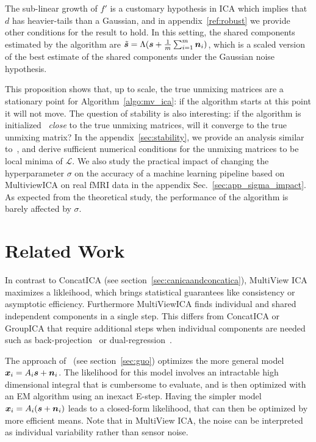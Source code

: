 %
The sub-linear growth of $f'$ is a customary hypothesis in ICA which implies that $d$ has heavier-tails than a Gaussian, and in appendix~\ref{ref:robust} we provide other conditions for the result to hold.
%
In this setting, the shared components estimated by the algorithm are $\tilde{\boldsymbol{s}} = \Lambda (\boldsymbol{s} + \frac1m \sum_{i=1}^m \boldsymbol{n}_i)$, which is a scaled version of the best estimate of the shared components under the Gaussian noise hypothesis.

This proposition shows that, up to scale, the true unmixing matrices are a stationary point for Algorithm~\ref{algo:mv_ica}: if the algorithm starts at this point it will not move.
%
The question of stability is also interesting: if the algorithm is initialized ~\emph{close} to the true unmixing matrices, will it converge to the true unmixing matrix?
%
In the appendix~\ref{sec:stability}, we provide an analysis similar to~\cite{cardoso1998blind}, and derive sufficient numerical conditions for the unmixing matrices to be local minima of $\mathcal{L}$.
%
We also study the practical impact of changing the hyperparameter $\sigma$ on the accuracy of a machine learning pipeline based on MultiviewICA on real fMRI data in the appendix Sec.~\ref{sec:app_sigma_impact}.
%
As expected from the theoretical study, the performance of the algorithm is barely affected by $\sigma$.

\section{Related Work}
In contrast to ConcatICA (see section~\ref{sec:canicaandconcatica}),
MultiView ICA maximizes a likleihood, which brings statistical guarantees like
consistency or asymptotic efficiency. Furthermore MultiViewICA finds individual
and shared independent components in a single step. This differs from ConcatICA or
GroupICA that require additional steps when individual components are needed
such as back-projection~\cite{calhoun2001method} or dual-regression~\cite{beckmann2009group}.

The approach of~\cite{guo2008unified} (see section~\ref{sec:guo}) optimizes the more
general model $\boldsymbol{x}_i = A_i\boldsymbol{s} + \boldsymbol{n}_i$. 
The likelihood for this model involves an intractable high dimensional integral
that is cumbersome to evaluate, and is then optimized with an EM algorithm using
an inexact E-step.
Having the simpler model $\boldsymbol{x}_i = A_i(\boldsymbol{s} + \boldsymbol{n}_i)$ leads to a closed-form likelihood,
that can then be optimized by more efficient means.
Note that in MultiView ICA, the noise can be interpreted as individual variability rather than sensor noise. %


